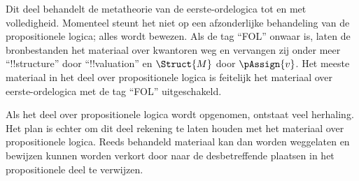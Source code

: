 \documentclass[../../include/open-logic-part]{subfiles}
\begin{document}

\begin{editorial}
  Dit deel behandelt de metatheorie van de eerste-ordelogica tot en met
  volledigheid. Momenteel steunt het niet op een afzonderlijke
  behandeling van de propositionele logica; alles wordt bewezen. Als de
  tag ``FOL'' onwaar is, laten de bronbestanden het materiaal over
  kwantoren weg en vervangen zij onder meer ``!!{structure}'' door
  ``!!{valuation}'' en $\Struct{M}$ door $\pAssign{v}$. Het meeste
  materiaal in het deel over propositionele logica is feitelijk het
  materiaal over eerste-ordelogica met de tag ``FOL'' uitgeschakeld.

  Als het deel over propositionele logica wordt opgenomen, ontstaat veel
  herhaling. Het plan is echter om dit deel rekening te laten houden met
  het materiaal over propositionele logica. Reeds behandeld materiaal
  kan dan worden weggelaten en bewijzen kunnen worden verkort door naar
  de desbetreffende plaatsen in het propositionele deel te verwijzen.
\end{editorial}












\OLEndPartHook
\end{document}
